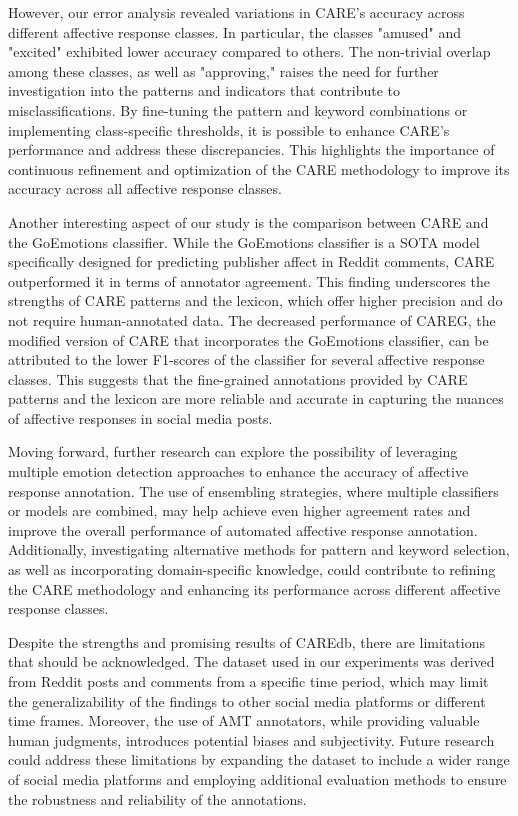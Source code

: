 \documentclass[conference]{IEEEtran}
\begin{document}
However, our error analysis revealed variations in CARE's accuracy across different affective response classes. In particular, the classes "amused" and "excited" exhibited lower accuracy compared to others. The non-trivial overlap among these classes, as well as "approving," raises the need for further investigation into the patterns and indicators that contribute to misclassifications. By fine-tuning the pattern and keyword combinations or implementing class-specific thresholds, it is possible to enhance CARE's performance and address these discrepancies. This highlights the importance of continuous refinement and optimization of the CARE methodology to improve its accuracy across all affective response classes.

Another interesting aspect of our study is the comparison between CARE and the GoEmotions classifier. While the GoEmotions classifier is a SOTA model specifically designed for predicting publisher affect in Reddit comments, CARE outperformed it in terms of annotator agreement. This finding underscores the strengths of CARE patterns and the lexicon, which offer higher precision and do not require human-annotated data. The decreased performance of CAREG, the modified version of CARE that incorporates the GoEmotions classifier, can be attributed to the lower F1-scores of the classifier for several affective response classes. This suggests that the fine-grained annotations provided by CARE patterns and the lexicon are more reliable and accurate in capturing the nuances of affective responses in social media posts.

Moving forward, further research can explore the possibility of leveraging multiple emotion detection approaches to enhance the accuracy of affective response annotation. The use of ensembling strategies, where multiple classifiers or models are combined, may help achieve even higher agreement rates and improve the overall performance of automated affective response annotation. Additionally, investigating alternative methods for pattern and keyword selection, as well as incorporating domain-specific knowledge, could contribute to refining the CARE methodology and enhancing its performance across different affective response classes.

Despite the strengths and promising results of CAREdb, there are limitations that should be acknowledged. The dataset used in our experiments was derived from Reddit posts and comments from a specific time period, which may limit the generalizability of the findings to other social media platforms or different time frames. Moreover, the use of AMT annotators, while providing valuable human judgments, introduces potential biases and subjectivity. Future research could address these limitations by expanding the dataset to include a wider range of social media platforms and employing additional evaluation methods to ensure the robustness and reliability of the annotations.
\end{document}
